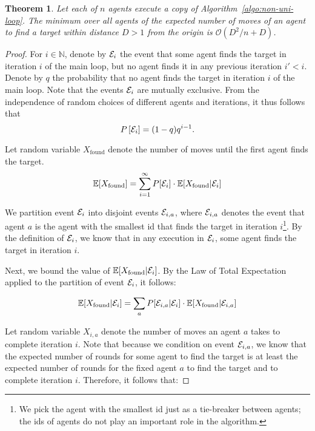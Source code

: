 \documentclass[11pt]{article}
\newtheorem{theorem}{Theorem}[section]
\newcommand{\N}{\mathbb{N}}
\newcommand{\E}{\mathbb{E}}
\newcommand{\BO}{\mathcal{O}}
\begin{document}
\begin{theorem}
\label{thm:upper}
Let each of $n$ agents execute a copy of Algorithm~\ref{algo:non-uni-loop}. The minimum over all agents of the expected number of moves of an agent to find a target within distance $D > 1$ from the origin is $\BO(D^2/n + D)$.
\end{theorem}
\begin{proof}
For $i\in \N$, denote by ${\cal E}_i$ the event that some agent finds the target in iteration $i$ of the main loop, but no agent finds it in any previous iteration $i' < i$. 
Denote by $q$ the probability that no agent finds the target in iteration $i$ of the main loop. 
Note that the events ${\cal E}_i$ are mutually exclusive. From the independence of random choices of different agents and iterations, it thus follows that
\begin{equation*}
P\left[{\cal E}_i\right] = (1-q)q^{i-1}.
\end{equation*}

Let random variable $X_{\text{found}}$ denote the number of moves until the first agent finds the target.
\begin{equation*}
\E[X_{\text{found}}] = \sum_{i=1}^{\infty} P[{\cal E}_i] \cdot \E[X_{\text{found}}| {\cal E}_i] 
\end{equation*}

We partition event ${\cal E}_i$ into disjoint events ${\cal E}_{i,a}$, where ${\cal E}_{i,a}$ denotes the event that agent $a$ is the agent with the smallest id that finds the target in iteration $i$\footnote{We pick the agent with the smallest id just as a tie-breaker between agents; the ids of agents do not play an important role in the algorithm.}. By the definition of ${\cal E}_i$, we know that in any execution in ${\cal E}_i$, some agent finds the target in iteration $i$.

Next, we bound the value of $\E[X_{\text{found}}| {\cal E}_i] $. By the Law of Total Expectation applied to the partition of event ${\cal E}_i$, it follows:

\begin{equation*}
\E[X_{\text{found}}| {\cal E}_i] = \sum_{a} P[{\cal E}_{i,a} | {\cal E}_i] \cdot \E[X_{\text{found}} | {\cal E}_{i,a}] 
\end{equation*}

Let random variable $X_{i,a}$ denote the number of moves an agent $a$ takes to complete iteration $i$. Note that because we condition on event ${\cal E}_{i,a}$, we know that the expected number of rounds for some agent to find the target is at least the expected number of rounds for the fixed agent $a$ to find the target and to complete iteration $i$. Therefore, it follows that: 


\end{proof}
\end{document}
